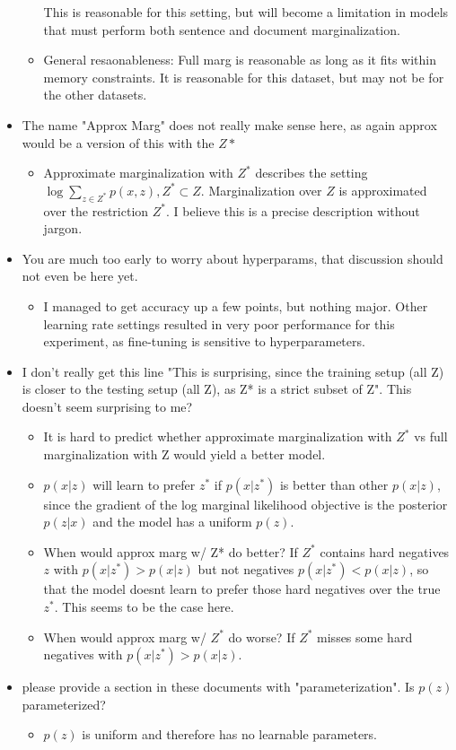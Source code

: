 \documentclass[11pt]{article}
\begin{document}
\begin{itemize}
\begin{itemize}
        This is reasonable for this setting, but will become a limitation in models
        that must perform both sentence and document marginalization.
    \item General resaonableness: Full marg is reasonable as long as it fits within memory constraints.
        It is reasonable for this dataset, but may not be for the other datasets.
    \end{itemize}
\item The name "Approx Marg" does not really make sense here, as again approx would be a version of this with the $Z*$
    \begin{itemize}
    \item Approximate marginalization with $Z^*$ describes the setting $\log\sum_{z\in Z^*} p(x,z), Z^*\subset Z$.
        Marginalization over $Z$ is approximated over the restriction $Z^*$.
        I believe this is a precise description without jargon.
    \end{itemize}
\item You are much too early to worry about hyperparams, that discussion should not even be here yet.
    \begin{itemize}
    \item I managed to get accuracy up a few points, but nothing major. Other learning rate
        settings resulted in very poor performance for this experiment,
        as fine-tuning is sensitive to hyperparameters.
    \end{itemize}
\item I don't really get this line "This is surprising, since the training setup (all Z) is closer to the testing setup (all Z), as Z* is a strict subset of Z". This doesn't seem surprising to me?
    \begin{itemize}
    \item It is hard to predict whether approximate marginalization with $Z^*$
        vs full marginalization with Z would yield a better model.
    \item $p(x|z)$ will learn to prefer $z^*$ if $p(x|z^*)$ is better than other $p(x|z)$,
        since the gradient of the log marginal likelihood objective is the posterior $p(z|x)$
        and the model has a uniform $p(z)$.
    \item When would approx marg w/ Z* do better?
        If $Z^*$ contains hard negatives $z$ with $p(x | z^*) > p(x | z)$ but not negatives $p(x | z^*) < p(x | z)$,
        so that the model doesnt learn to prefer those hard negatives over the true $z^*$.
        This seems to be the case here.
    \item When would approx marg w/ $Z^*$ do worse?
        If $Z^*$ misses some hard negatives with $p(x | z^*) > p(x | z)$.
    \end{itemize}
\item please provide a section in these documents with "parameterization". Is $p(z)$ parameterized?
    \begin{itemize}
    \item $p(z)$ is uniform and therefore has no learnable parameters.
    \end{itemize}
\end{itemize}
\end{document}
